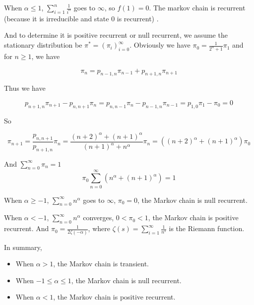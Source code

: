 \documentclass{article}
\begin{document}
When $\alpha\leqslant 1$, $\sum_{i=1}^n \frac{1}{i^\alpha}$ goes to $\infty$, so $f(1) = 0$. The markov chain is recurrent (because it is irreducible and state $0$ is recurrent) .

And to determine it is positive recurrent or null recurrent, we assume the stationary distribution be $\pi^* = (\pi_i)_{i=0}^{\infty}$. Obviously we have $\pi_0 = \frac{1}{2^{\alpha}+1} \pi_1$ and for $n\geqslant 1$, we have 

\begin{equation}
    \pi_n = p_{n-1,n}\pi_{n-1} + p_{n+1,n}\pi_{n+1} 
\end{equation}

Thus we have 

\begin{equation}
    p_{n+1,n} \pi_{n+1} - p_{n,n+1}  \pi_{n} = p_{n,n-1} \pi_{n} - p_{n-1,n}  \pi_{n-1} = p_{1,0} \pi_{1} - \pi_{0} = 0
\end{equation}

So 

\begin{equation}
    \pi_{n+1} = \frac{p_{n,n+1}}{p_{n+1,n}} \pi_{n} = \frac{(n+2)^\alpha + (n+1)^\alpha}{(n+1)^\alpha + n^\alpha} \pi_{n} = ((n+2)^{\alpha} +(n+1)^\alpha) \pi_{0}
\end{equation}

And $\sum_{n=0}^{\infty} \pi_{n}= 1$
\begin{equation}
    \pi_0 \sum_{n=0}^{\infty} (n^\alpha + (n+1)^{\alpha}) = 1
\end{equation}

When $\alpha \geqslant -1$, $\sum_{n=0}^{\infty} n^\alpha $ goes to $\infty$, $\pi_0 = 0$, the Markov chain is null recurrent.

When $\alpha < -1$, $\sum_{n=0}^{\infty} n^\alpha $ converges, $0<\pi_0 < 1$, the Markov chain is positive recurrent. And $\pi_0  = \frac{1}{2\zeta(-\alpha) }$, where $\zeta(s) = \sum_{i=1}^{\infty} \frac{1}{n^s}$ is the Riemann function.

In summary,

\begin{itemize}
    \item When $\alpha> 1$, the Markov chain is transient.
    \item When $-1 \leqslant \alpha \leqslant 1$, the Markov chain is null recurrent.
    \item When $\alpha < 1$, the Markov chain is positive recurrent.
\end{itemize}
\end{document}
